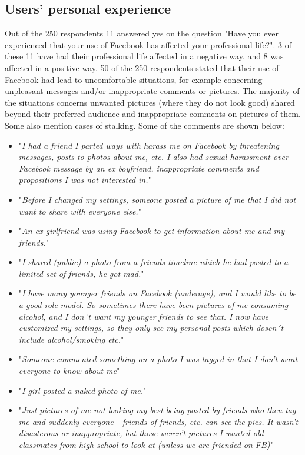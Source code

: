 \subsection{Users' personal experience}
Out of the 250 respondents 11 answered yes on the question "Have you ever experienced that your use of Facebook has affected your professional life?". 3 of these 11 have had their professional life affected in a negative way, and 8 was affected in a positive way. 
50 of the 250 respondents stated that their use of Facebook had lead to uncomfortable situations, for example concerning unpleasant messages and/or inappropriate comments or pictures. The majority of the situations concerns unwanted pictures (where they do not look good) shared beyond their preferred audience and inappropriate comments on pictures of them. Some also mention cases of stalking. Some of the comments are shown below:

\begin{itemize} 
\item "\textit{I had a friend I parted ways with harass me on Facebook by threatening messages, posts to photos about me, etc. I also had sexual harassment over Facebook message by an ex boyfriend, inappropriate comments and propositions I was not interested in.}"
\item "\textit{Before I changed my settings, someone posted a picture of me that I did not want to share with everyone else.}"
\item "\textit{An ex girlfriend was using Facebook to get information about me and my friends.}"
\item "\textit{I shared (public) a photo from a friends timeline which he had posted to a limited set of friends, he got mad.}"
\item "\textit{I have many younger friends on Facebook (underage), and I would like to be a good role model. So sometimes there have been pictures of me consuming alcohol, and I don´t want my younger friends to see that. I now have customized my settings, so they only see my personal posts which dosen´t include alcohol/smoking etc.}"
\item "\textit{Someone commented something on a photo I was tagged in that I don't want everyone to know about me}"
\item "\textit{I girl posted a naked photo of me.}"
\item "\textit{Just pictures of me not looking my best being posted by friends who then tag me and suddenly everyone - friends of friends, etc. can see the pics. It wasn't disasterous or inappropriate, but those weren't pictures I wanted old classmates from high school to look at (unless we are friended on FB)}"
\end{itemize}

